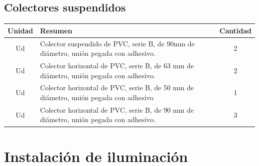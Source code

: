 \documentclass[../main.tex]{subfiles}
\begin{document}
\subsection{Colectores suspendidos}
\begin{table}[H]
    \centering
    \begin{tabular}{c p{11.5cm} c}
        Unidad & Resumen & Cantidad  \\ \hline
        Ud & Colector suspendido de PVC, serie B, de 90mm de diámetro, unión pegada con adhesivo. & 2 \\
        Ud & Colector horizontal de PVC, serie B, de 63 mm de diámetro, unión pegada con adhesivo. & 2 \\
        Ud & Colector horizontal de PVC, serie B, de 50 mm de diámetro, unión pegada con adhesivo & 1 \\
        Ud & Colector horizontal de PVC, serie B, de 90 mm de diámetro, unión pegada con adhesivo. & 3 \\
    \end{tabular}
\end{table}

\section{Instalación de iluminación}
\end{document}
